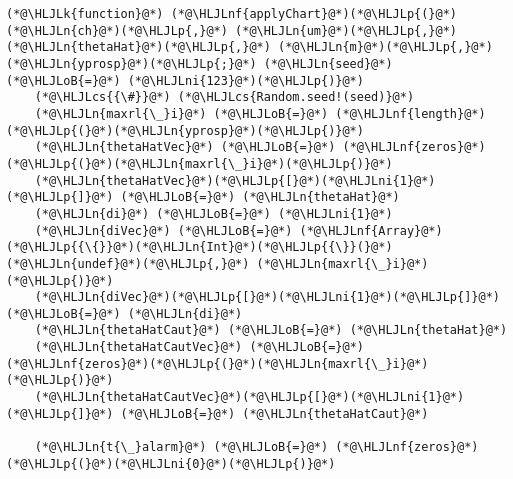 \documentclass[12pt,a4paper]{article}
\newcommand{\HLJLk}[1]{\textcolor[RGB]{148,91,176}{\textbf{#1}}}
\newcommand{\HLJLn}[1]{#1}
\newcommand{\HLJLnf}[1]{\textcolor[RGB]{66,102,213}{#1}}
\newcommand{\HLJLni}[1]{\textcolor[RGB]{59,151,46}{#1}}
\newcommand{\HLJLoB}[1]{\textcolor[RGB]{102,102,102}{\textbf{#1}}}
\newcommand{\HLJLp}[1]{#1}
\newcommand{\HLJLcs}[1]{\textcolor[RGB]{153,153,119}{\textit{#1}}}
\begin{document}
\begin{lstlisting}
(*@\HLJLk{function}@*) (*@\HLJLnf{applyChart}@*)(*@\HLJLp{(}@*)(*@\HLJLn{ch}@*)(*@\HLJLp{,}@*) (*@\HLJLn{um}@*)(*@\HLJLp{,}@*) (*@\HLJLn{thetaHat}@*)(*@\HLJLp{,}@*) (*@\HLJLn{m}@*)(*@\HLJLp{,}@*) (*@\HLJLn{yprosp}@*)(*@\HLJLp{;}@*) (*@\HLJLn{seed}@*) (*@\HLJLoB{=}@*) (*@\HLJLni{123}@*)(*@\HLJLp{)}@*)
    (*@\HLJLcs{{\#}}@*) (*@\HLJLcs{Random.seed!(seed)}@*)
    (*@\HLJLn{maxrl{\_}i}@*) (*@\HLJLoB{=}@*) (*@\HLJLnf{length}@*)(*@\HLJLp{(}@*)(*@\HLJLn{yprosp}@*)(*@\HLJLp{)}@*)
    (*@\HLJLn{thetaHatVec}@*) (*@\HLJLoB{=}@*) (*@\HLJLnf{zeros}@*)(*@\HLJLp{(}@*)(*@\HLJLn{maxrl{\_}i}@*)(*@\HLJLp{)}@*)
    (*@\HLJLn{thetaHatVec}@*)(*@\HLJLp{[}@*)(*@\HLJLni{1}@*)(*@\HLJLp{]}@*) (*@\HLJLoB{=}@*) (*@\HLJLn{thetaHat}@*)
    (*@\HLJLn{di}@*) (*@\HLJLoB{=}@*) (*@\HLJLni{1}@*)
    (*@\HLJLn{diVec}@*) (*@\HLJLoB{=}@*) (*@\HLJLnf{Array}@*)(*@\HLJLp{{\{}}@*)(*@\HLJLn{Int}@*)(*@\HLJLp{{\}}(}@*)(*@\HLJLn{undef}@*)(*@\HLJLp{,}@*) (*@\HLJLn{maxrl{\_}i}@*)(*@\HLJLp{)}@*)
    (*@\HLJLn{diVec}@*)(*@\HLJLp{[}@*)(*@\HLJLni{1}@*)(*@\HLJLp{]}@*) (*@\HLJLoB{=}@*) (*@\HLJLn{di}@*)
    (*@\HLJLn{thetaHatCaut}@*) (*@\HLJLoB{=}@*) (*@\HLJLn{thetaHat}@*)
    (*@\HLJLn{thetaHatCautVec}@*) (*@\HLJLoB{=}@*) (*@\HLJLnf{zeros}@*)(*@\HLJLp{(}@*)(*@\HLJLn{maxrl{\_}i}@*)(*@\HLJLp{)}@*)
    (*@\HLJLn{thetaHatCautVec}@*)(*@\HLJLp{[}@*)(*@\HLJLni{1}@*)(*@\HLJLp{]}@*) (*@\HLJLoB{=}@*) (*@\HLJLn{thetaHatCaut}@*)

    (*@\HLJLn{t{\_}alarm}@*) (*@\HLJLoB{=}@*) (*@\HLJLnf{zeros}@*)(*@\HLJLp{(}@*)(*@\HLJLni{0}@*)(*@\HLJLp{)}@*)


\end{lstlisting}
\end{document}
